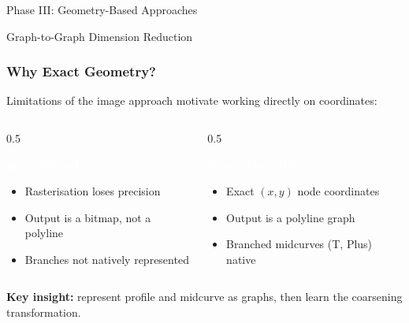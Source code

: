 \begin{frame}[fragile]\frametitle{}
\begin{center}
{\Large Phase III: Geometry-Based Approaches}

Graph-to-Graph Dimension Reduction
\end{center}
\end{frame}

\begin{frame}[fragile]\frametitle{Why Exact Geometry?}

Limitations of the image approach motivate working directly on coordinates:

\begin{columns}[t]
  \begin{column}[T]{0.5\linewidth}
  \begin{block}{\textcolor{white}{Image (Phase I)}}
    \begin{itemize}
    \item[\tiny$\blacktriangleright$] Rasterisation loses precision
    \item[\tiny$\blacktriangleright$] Output is a bitmap, not a polyline
    \item[\tiny$\blacktriangleright$] Branches not natively represented
    \end{itemize}
  \end{block}
  \end{column}
  \begin{column}[T]{0.5\linewidth}
  \begin{block}{\textcolor{white}{Graph (Phase III)}}
    \begin{itemize}
    \item[\tiny$\blacktriangleright$] Exact $(x,y)$ node coordinates
    \item[\tiny$\blacktriangleright$] Output is a polyline graph
    \item[\tiny$\blacktriangleright$] Branched midcurves (T, Plus) native
    \end{itemize}
  \end{block}
  \end{column}
\end{columns}

\vspace{4pt}
\textbf{Key insight:} represent profile and midcurve as graphs, then learn the coarsening transformation.

\end{frame}

